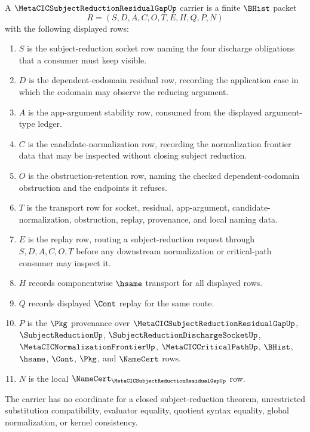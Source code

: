 \begin{definition}
\label{def:metacic-subject-reduction-residual-gap-carrier}
A $\MetaCICSubjectReductionResidualGapUp$ carrier is a finite $\BHist$ packet
$$
R=(S,D,A,C,O,T,E,H,Q,P,N)
$$
with the following displayed rows:
\begin{enumerate}
\item $S$ is the subject-reduction socket row naming the four discharge
obligations that a consumer must keep visible.
\item $D$ is the dependent-codomain residual row, recording the application
case in which the codomain may observe the reducing argument.
\item $A$ is the app-argument stability row, consumed from the displayed
argument-type ledger.
\item $C$ is the candidate-normalization row, recording the normalization
frontier data that may be inspected without closing subject reduction.
\item $O$ is the obstruction-retention row, naming the checked
dependent-codomain obstruction and the endpoints it refuses.
\item $T$ is the transport row for socket, residual, app-argument,
candidate-normalization, obstruction, replay, provenance, and local naming
data.
\item $E$ is the replay row, routing a subject-reduction request through
$S,D,A,C,O,T$ before any downstream normalization or critical-path consumer
may inspect it.
\item $H$ records componentwise $\hsame$ transport for all displayed rows.
\item $Q$ records displayed $\Cont$ replay for the same route.
\item $P$ is the $\Pkg$ provenance over
$\MetaCICSubjectReductionResidualGapUp$, $\SubjectReductionUp$,
$\SubjectReductionDischargeSocketUp$, $\MetaCICNormalizationFrontierUp$,
$\MetaCICCriticalPathUp$, $\BHist$, $\hsame$, $\Cont$, $\Pkg$, and
$\NameCert$ rows.
\item $N$ is the local $\NameCert_{\MetaCICSubjectReductionResidualGapUp}$ row.
\end{enumerate}
The carrier has no coordinate for a closed subject-reduction theorem,
unrestricted substitution compatibility, evaluator equality, quotient syntax
equality, global normalization, or kernel consistency.
\end{definition}

